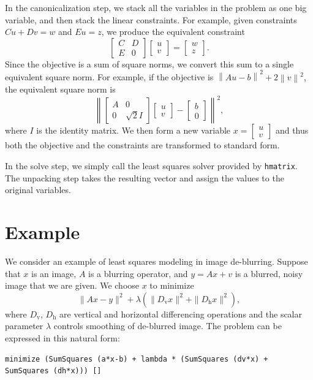 \documentclass[12pt]{article}
\providecommand{\norm}[1]{\left\lVert#1\right\rVert}
\begin{document}
In the canonicalization step, we stack all the variables in the problem as one
big variable, and then stack the linear constraints.
For example, given constraints $Cu + Dv = w$ and $Eu = z$, we produce the equivalent
constraint
\begin{equation*}
  \begin{bmatrix} C & D \\ E & 0 \end{bmatrix} \begin{bmatrix} u \\
    v \end{bmatrix} = \begin{bmatrix} w \\ z \end{bmatrix}.
\end{equation*}
Since the objective is a sum of square norms, we convert this sum to a single
equivalent square norm.
For example, if the objective is $\norm{Au - b}^2 + 2\norm{v}^2$, the equivalent
square norm is
\begin{equation*}
  \norm{\begin{bmatrix} A & 0 \\ 0 & \sqrt{2}I \end{bmatrix} \begin{bmatrix} u
      \\ v \end{bmatrix} - \begin{bmatrix} b \\ 0 \end{bmatrix} }^2,
\end{equation*}
where $I$ is the identity matrix.
We then form a new variable $x = \begin{bmatrix} u \\ v \end{bmatrix}$ and thus
both the objective and the constraints are transformed to standard form.

In the solve step, we simply call the least squares solver provided by
\verb|hmatrix|. The unpacking step takes the resulting vector and assign the
values to the original variables.

\section{Example}

We consider an example of least squares modeling in image de-blurring. Suppose
that $x$ is an image, $A$ is a blurring operator, and $y = Ax + v$ is a blurred,
noisy image that we are given. We choose $x$ to minimize
\begin{equation*}
 \|Ax -  y\|^2 + \lambda (\|D_\mathrm v x\|^2 + \|D_\mathrm h x\|^2),
\end{equation*}
where $D_\mathrm v$, $D_\mathrm h$ are vertical and horizontal differencing
operations and the scalar parameter $\lambda$ controls smoothing of de-blurred
image. The problem can be expressed in this natural form:
\begin{verbatim}
minimize (SumSquares (a*x-b) + lambda * (SumSquares (dv*x) + SumSquares (dh*x))) []
\end{verbatim}
\end{document}
